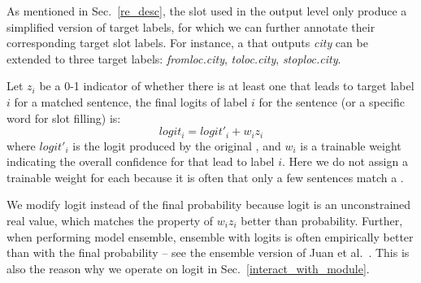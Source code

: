 
As mentioned in Sec.~\ref{re_desc}, the slot \REs used in the output level only produce a simplified version of target labels, for which
we can further
annotate their corresponding target slot labels.
For instance, a \RE that outputs \emph{city} can be extended to three target labels: \emph{fromloc.city}, \emph{toloc.city},
\emph{stoploc.city}.

Let $z_i$ be a 0-1 indicator of whether there is at least one \RE that leads to target label $i$ for a matched sentence, the final logits
of label $i$ for the sentence (or a specific word for slot filling) is:
\begin{equation}
logit_i = logit'_i + w_i z_i
\end{equation}
where $logit'_i$ is the logit produced by the original \NN, and $w_i$ is a trainable weight indicating the overall confidence for \REs that
lead to label $i$. Here we do not assign a trainable weight for each \RE because it is often that only a few sentences match a \RE.

We modify logit instead of the final probability because logit is an unconstrained real value, which matches the property of $w_i z_i$ better than probability.
Further, when performing model ensemble,
ensemble with logits is often empirically better than with the final probability -- see the ensemble version of Juan et al.~. This is also the reason why we operate on logit %
in Sec.~\ref{interact_with_module}.
